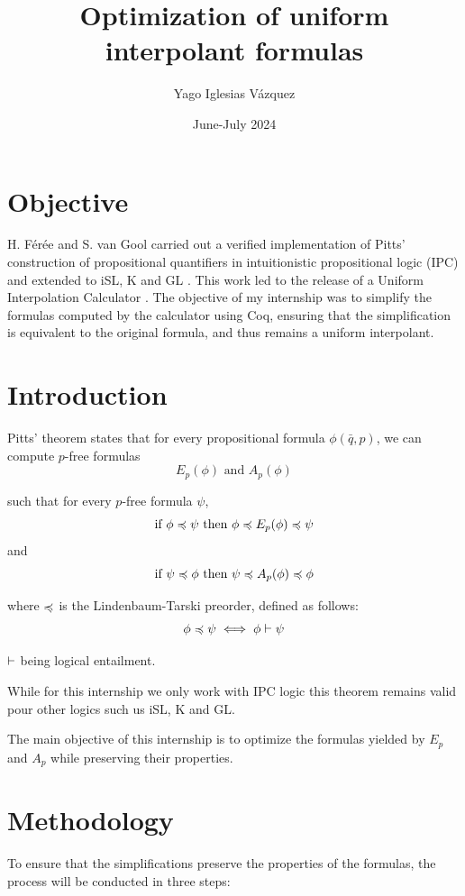 \documentclass{article}
\title{Optimization of uniform interpolant formulas}
\author{Yago Iglesias Vázquez}
\date{June-July 2024}
\begin{document}
\maketitle

\section{Objective}

H. Férée and S. van Gool carried out a verified implementation of Pitts' \citep{pitts:interpolation} construction of propositional quantifiers in intuitionistic propositional
logic (IPC) \citep{feree_van-gool:computing_prop} and extended to iSL, K and GL \citep{feree_van-gool:ijcar}. This work led to the release of a Uniform Interpolation
Calculator \citep{github:uiml}. The objective of my internship was to simplify the formulas computed by the calculator using Coq, ensuring that the simplification is equivalent to
the original formula, and thus remains a uniform interpolant.

\section{Introduction}

Pitts' theorem states that for every propositional formula $\phi (\bar{q}, p)$, we can compute $p$-free formulas
\[
	E_p (\phi) \text{ and } A_p (\phi)
\]

such that for every \(p\)-free formula \(\psi\),
\[
	\text{if } \phi \preccurlyeq \psi \text{ then } \phi \preccurlyeq E_p (\phi) \preccurlyeq \psi
\]
and
\[
	\text{if } \psi \preccurlyeq \phi \text{ then } \psi \preccurlyeq A_p (\phi) \preccurlyeq \phi
\]

where \(\preccurlyeq\) is the Lindenbaum-Tarski preorder, defined as follows:
\[
	\phi \preccurlyeq \psi \iff \phi \vdash \psi
\]

$\vdash$ being logical entailment.

While for this internship we only work with IPC logic this theorem remains valid pour other logics such us iSL, K and GL.

The main objective of this internship is to optimize the formulas yielded by $E_p$ and $A_p$ while preserving their properties.


\section{Methodology}

To ensure that the simplifications preserve the properties of the formulas, the process will be conducted in three steps:
\end{document}
